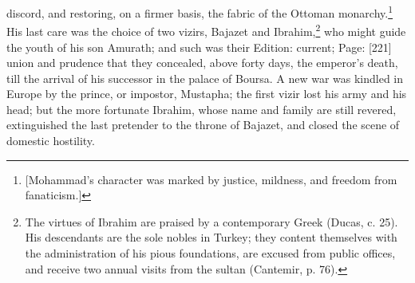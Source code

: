 discord, and restoring, on a firmer basis, the fabric of the Ottoman monarchy.\footnote{[Mohammad\texthebrew{}’s character was marked by justice, mildness, and freedom from fanaticism.]} His last care was the choice of two vizirs, Bajazet and Ibrahim,\footnote{The virtues of Ibrahim are praised by a contemporary Greek (Ducas, c. 25). His descendants are the sole nobles in Turkey; they content themselves with the administration of his pious foundations, are excused from public offices, and receive two annual visits from the sultan (Cantemir, p. 76).} who might guide the youth of his son Amurath; and such was their Edition: current; Page: [221] union and prudence that they concealed, above forty days, the emperor\texthebrew{}’s death, till the arrival of his successor in the palace of Boursa. A new war was kindled in Europe by the prince, or impostor, Mustapha; the first vizir lost his army and his head; but the more fortunate Ibrahim, whose name and family are still revered, extinguished the last pretender to the throne of Bajazet, and closed the scene of domestic hostility.

